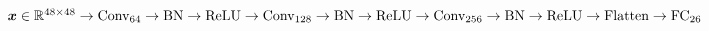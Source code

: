 $\vect{x} \in \real^{48 \times 48} \newline
	\rightarrow \text{Conv}_{64} \rightarrow \text{BN} \rightarrow \text{ReLU}  \newline
	\rightarrow \text{Conv}_{128} \rightarrow \text{BN} \rightarrow \text{ReLU}  \newline
	\rightarrow \text{Conv}_{256} \rightarrow \text{BN} \rightarrow \text{ReLU}  \newline
	\rightarrow \text{Flatten} \rightarrow \text{FC}_{26}
$